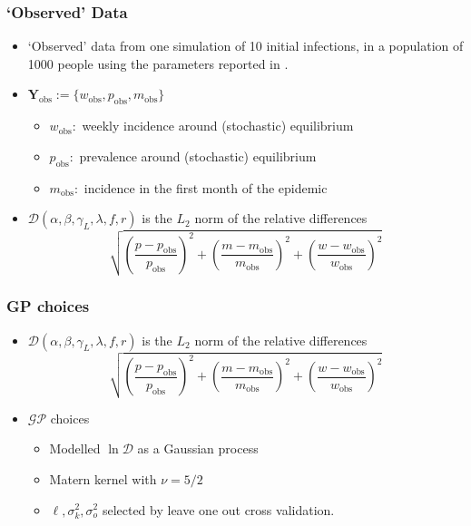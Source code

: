 \documentclass{beamer}
\begin{document}
\begin{frame}
    \frametitle{`Observed' Data}
    \begin{itemize}
        \item `Observed' data from one simulation of 10 initial infections,
              in a population of 1000 people using the parameters reported in
              \cite{champagne_using_2022}.
        \item $\mathbf{Y}_\text{obs} := \{w_\text{obs}, p_\text{obs}, m_\text{obs}\}$
              \begin{itemize}
                  \item $w_\text{obs}:$ weekly incidence around (stochastic) equilibrium
                  \item $p_\text{obs}:$ prevalence around (stochastic) equilibrium
                  \item $m_\text{obs}:$ incidence in the first month of the epidemic
              \end{itemize}
        \item <3-> $
                  \mathcal{D}(\alpha, \beta, \gamma_L, \lambda, f, r)$ is the
              $L_2$ norm of the relative differences
              $$
                  \sqrt{
                      \left(\frac{p - p_\text{obs}}{p_\text{obs}}\right)^2
                      + \left(\frac{m - m_\text{obs}}{m_\text{obs}}\right)^2
                      + \left(\frac{w - w_\text{obs}}{w_\text{obs}}\right)^2
                  }
              $$
    \end{itemize}
\end{frame}

\begin{frame}
    \frametitle{GP choices}
    \begin{itemize}
        \item $\mathcal{D}(\alpha, \beta, \gamma_L, \lambda, f, r)$ is the
              $L_2$ norm of the relative differences
              $$
                  \sqrt{
                      \left(\frac{p - p_\text{obs}}{p_\text{obs}}\right)^2
                      + \left(\frac{m - m_\text{obs}}{m_\text{obs}}\right)^2
                      + \left(\frac{w - w_\text{obs}}{w_\text{obs}}\right)^2
                  }
              $$
        \item $\mathcal{GP}$ choices
              \begin{itemize}
                  \item Modelled $\ln\mathcal{D}$ as a Gaussian process
                  \item Matern kernel with $\nu = 5/2$
                  \item $\ell, \sigma^2_k, \sigma^2_o$ selected by leave
                        one out cross validation.
              \end{itemize}
    \end{itemize}
\end{frame}
\end{document}
